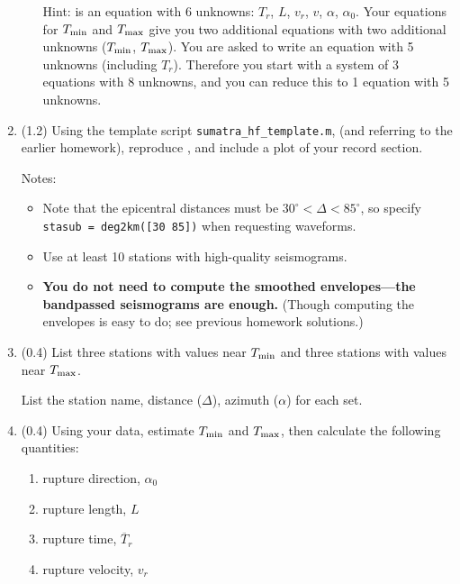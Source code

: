 \documentclass[11pt,titlepage,fleqn]{article}
\begin{document}
\begin{enumerate}
\begin{enumerate}
Hint:  is an equation with 6 unknowns: $T_r$, $L$, $v_r$, $v$, $\alpha$, $\alpha_0$. Your equations for $T_{\rm min}$ and $T_{\rm max}$ give you two additional equations with two additional unknowns ($T_{\rm min}$, $T_{\rm max}$). You are asked to write an equation with 5 unknowns (including $T_r$). Therefore you start with a system of 3 equations with 8 unknowns, and you can reduce this to 1 equation with 5 unknowns.

\end{enumerate}


\item (1.2) Using the template script \verb+sumatra_hf_template.m+, (and referring to the earlier homework), reproduce \citet[][Figure~1d]{Ni2005}, and include a plot of your record section.

Notes:
%
\begin{itemize}
\item Note that the epicentral distances must be $30^\circ < \Delta < 85^\circ$, so specify \\
\verb+stasub = deg2km([30 85])+ when requesting waveforms.

\item Use at least 10 stations with high-quality seismograms.

\item {\bf You do not need to compute the smoothed envelopes---the bandpassed seismograms are enough.} (Though computing the envelopes is easy to do; see previous homework solutions.) 
\end{itemize}


\item (0.4) List three stations with values near $T_{\rm min}$ and three stations with values near $T_{\rm max}$.

List the station name, distance ($\Delta$), azimuth ($\alpha$) for each set.



\item (0.4) Using your data, estimate $T_{\rm min}$ and $T_{\rm max}$, then calculate the following quantities:
%
\begin{enumerate}
\item rupture direction, $\alpha_0$
\item rupture length, $L$
\item rupture time, $\overline{T}_r$
\item rupture velocity, $v_r$
\end{enumerate}


\end{enumerate}
\end{document}
